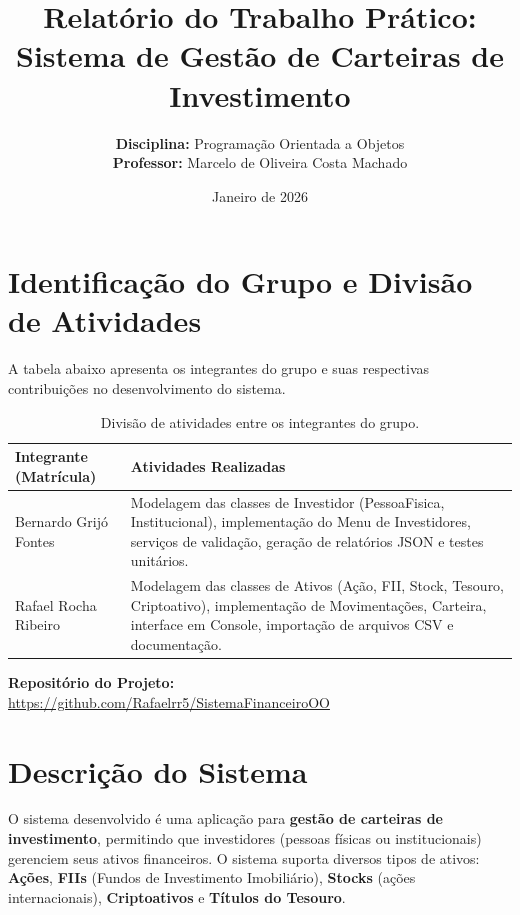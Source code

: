 \documentclass[11pt, a4paper]{article}
\title{\vspace{-2cm} \textbf{Relatório do Trabalho Prático:\\Sistema de Gestão de Carteiras de Investimento}}
\author{
    \textbf{Disciplina:} Programação Orientada a Objetos \\
    \textbf{Professor:} Marcelo de Oliveira Costa Machado
}
\date{Janeiro de 2026}
\begin{document}
\maketitle
\thispagestyle{empty}

\section{Identificação do Grupo e Divisão de Atividades}

A tabela abaixo apresenta os integrantes do grupo e suas respectivas contribuições no desenvolvimento do sistema.

\begin{table}[H]
    \centering
    \begin{tabular}{@{}p{5cm}p{9cm}@{}}
        \toprule
        \textbf{Integrante (Matrícula)} & \textbf{Atividades Realizadas} \\ \midrule
        Bernardo Grijó Fontes & Modelagem das classes de Investidor (PessoaFisica, Institucional), implementação do Menu de Investidores, serviços de validação, geração de relatórios JSON e testes unitários. \\ \midrule
        Rafael Rocha Ribeiro & Modelagem das classes de Ativos (Ação, FII, Stock, Tesouro, Criptoativo), implementação de Movimentações, Carteira, interface em Console, importação de arquivos CSV e documentação. \\ \bottomrule
    \end{tabular}
    \caption{Divisão de atividades entre os integrantes do grupo.}
\end{table}

\noindent \textbf{Repositório do Projeto:} \\
\url{https://github.com/Rafaelrr5/SistemaFinanceiroOO}

\section{Descrição do Sistema}

O sistema desenvolvido é uma aplicação para \textbf{gestão de carteiras de investimento}, permitindo que investidores (pessoas físicas ou institucionais) gerenciem seus ativos financeiros. O sistema suporta diversos tipos de ativos: \textbf{Ações}, \textbf{FIIs} (Fundos de Investimento Imobiliário), \textbf{Stocks} (ações internacionais), \textbf{Criptoativos} e \textbf{Títulos do Tesouro}.
\end{document}
